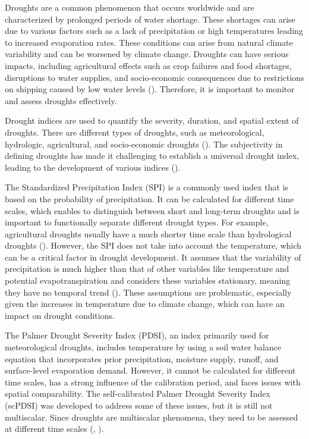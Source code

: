 \documentclass[
]{krantz}
\begin{document}
Droughts are a common phenomenon that occurs worldwide and are characterized by prolonged periods of water shortage. These shortages can arise due to various factors such as a lack of precipitation or high temperatures leading to increased evaporation rates. These conditions can arise from natural climate variability and can be worsened by climate change. Droughts can have serious impacts, including agricultural effects such as crop failures and food shortages, disruptions to water supplies, and socio-economic consequences due to restrictions on shipping caused by low water levels (\citet{wilhite1985}). Therefore, it is important to monitor and assess droughts effectively.

Drought indices are used to quantify the severity, duration, and spatial extent of droughts.
There are different types of droughts, such as meteorological, hydrologic, agricultural, and socio-economic droughts (\citet{wilhite1985}). The subjectivity in defining droughts has made it challenging to establish a universal drought index, leading to the development of various indices (\citet{vicente}).

The Standardized Precipitation Index (SPI) is a commonly used index that is based on the probability of precipitation.
It can be calculated for different time scales, which enables to distinguish between short and long-term droughts and is important to functionally separate different drought types. For example, agricultural droughts usually have a much shorter time scale than hydrological droughts (\citet{mckee1993}).
However, the SPI does not take into account the temperature, which can be a critical factor in drought development. It assumes that the variability of precipitation is much higher than that of other variables like temperature and potential evapotranspiration and considers these variables stationary, meaning they have no temporal trend (\citet{vicente}). These assumptions are problematic, especially given the increases in temperature due to climate change, which can have an impact on drought conditions.

The Palmer Drought Severity Index (PDSI), an index primarily used for meteorological droughts, includes temperature by using a soil water balance equation that incorporates prior precipitation, moisture supply, runoff, and surface-level evaporation demand. However, it cannot be calculated for different time scales, has a strong influence of the calibration period, and faces issues with spatial comparability. The self-calibrated Palmer Drought Severity Index (scPDSI) was developed to address some of these issues, but it is still not multiscalar. Since droughts are multiscalar phenomena, they need to be assessed at different time scales (\citet{vicente}, \citet{mckee1993}).
\end{document}
